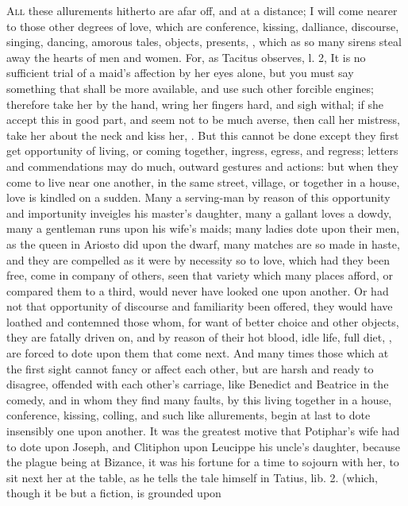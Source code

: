 \lettrine{A}{ll} these allurements hitherto are afar off, and at a distance; I will
come nearer to those other degrees of love, which are conference,
kissing, dalliance, discourse, singing, dancing, amorous tales,
objects, presents, \etc{}, which as so many sirens steal away the hearts
of men and women. For, as Tacitus observes, l. 2, It is no
sufficient trial of a maid's affection by her eyes alone, but you must
say something that shall be more available, and use such other forcible
engines; therefore take her by the hand, wring her fingers hard, and
sigh withal; if she accept this in good part, and seem not to be much
averse, then call her mistress, take her about the neck and kiss her,
\etc{}. But this cannot be done except they first get opportunity of
living, or coming together, ingress, egress, and regress; letters and
commendations may do much, outward gestures and actions: but when they
come to live near one another, in the same street, village, or together
in a house, love is kindled on a sudden. Many a serving-man by reason
of this opportunity and importunity inveigles his master's daughter,
many a gallant loves a dowdy, many a gentleman runs upon his wife's
maids; many ladies dote upon their men, as the queen in Ariosto did
upon the dwarf, many matches are so made in haste, and they are
compelled as it were by necessity so to love, which had they been
free, come in company of others, seen that variety which many places
afford, or compared them to a third, would never have looked one upon
another. Or had not that opportunity of discourse and familiarity been
offered, they would have loathed and contemned those whom, for want of
better choice and other objects, they are fatally driven on, and by
reason of their hot blood, idle life, full diet, \etc{}, are forced to
dote upon them that come next. And many times those which at the first
sight cannot fancy or affect each other, but are harsh and ready to
disagree, offended with each other's carriage, like Benedict and
Beatrice in the comedy, and in whom they find many faults, by
this living together in a house, conference, kissing, colling, and such
like allurements, begin at last to dote insensibly one upon another.
It was the greatest motive that Potiphar's wife had to dote upon
Joseph, and Clitiphon upon Leucippe his uncle's daughter, because
the plague being at Bizance, it was his fortune for a time to sojourn
with her, to sit next her at the table, as he tells the tale himself in
Tatius, lib. 2. (which, though it be but a fiction, is grounded upon
